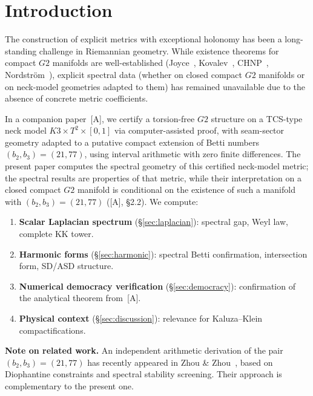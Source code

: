\documentclass[11pt,a4paper]{article}
\newcommand{\Gtwo}{\mathrm{G}_2}
\def\Gtwo{G2}%
\begin{document}
\newpage
\tableofcontents

\newpage

\section{Introduction}

The construction of explicit metrics with exceptional holonomy has been a long-standing challenge in Riemannian geometry. While existence theorems for compact $\Gtwo$ manifolds are well-established (Joyce~\cite{Joyce2000}, Kovalev~\cite{Kovalev2003}, CHNP~\cite{CHNP2015}, Nordstr\"om~\cite{Nordstrom2023}), explicit spectral data (whether on closed compact $\Gtwo$ manifolds or on neck-model geometries adapted to them) has remained unavailable due to the absence of concrete metric coefficients.

In a companion paper~[A], we certify a torsion-free $\Gtwo$ structure on a TCS-type neck model $K3 \times T^2 \times [0,1]$ via computer-assisted proof, with seam-sector geometry adapted to a putative compact extension of Betti numbers $(b_2, b_3) = (21, 77)$, using interval arithmetic with zero finite differences. The present paper computes the spectral geometry of this certified neck-model metric; the spectral results are properties of that metric, while their interpretation on a closed compact $\Gtwo$ manifold is conditional on the existence of such a manifold with $(b_2, b_3) = (21, 77)$ ([A], §2.2). We compute:

\begin{enumerate}
\item \textbf{Scalar Laplacian spectrum} (§\ref{sec:laplacian}): spectral gap, Weyl law, complete KK tower.
\item \textbf{Harmonic forms} (§\ref{sec:harmonic}): spectral Betti confirmation, intersection form, SD/ASD structure.
\item \textbf{Numerical democracy verification} (§\ref{sec:democracy}): confirmation of the analytical theorem from~[A].
\item \textbf{Physical context} (§\ref{sec:discussion}): relevance for Kaluza--Klein compactifications.
\end{enumerate}

\textbf{Note on related work.} An independent arithmetic derivation of the pair $(b_2, b_3) = (21, 77)$ has recently appeared in Zhou \& Zhou~\cite{ZhouZhouA2026,ZhouZhouE2026}, based on Diophantine constraints and spectral stability screening. Their approach is complementary to the present one.
\end{document}
